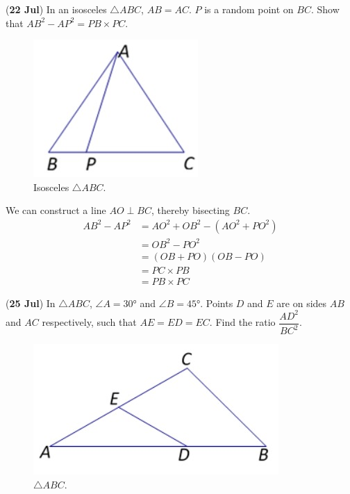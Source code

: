 \documentclass[12pt,answers]{exam}
\renewcommand{\frac}[2]{\dfrac{#1}{#2}}
\newcommand{\qndate}[2]{(\textbf{#1 #2})}
\begin{document}
\begin{questions}
	\question \qndate{22}{Jul} In an isosceles $\triangle ABC$, $AB=AC$. $P$ is a
	random point on $BC$. Show that ${AB}^2 - {AP}^2 = PB \times PC$.
	\begin{figure}[htpb]
		\centering
		\includegraphics[scale=.6]{images/0722_Tri.jpeg}
		\caption{Isosceles $\triangle ABC$.}
		\label{fig:0722_Tri}
	\end{figure}
	\begin{solution}
		We can construct a line $AO \perp BC$, thereby bisecting $BC$.
		\begin{align*}
			AB^2 - AP^2 & = AO^2 + OB^2 - \left(AO^2 + PO^2\right) \\
			            & = OB^2 - PO^2                            \\
			            & = (OB+PO)(OB-PO)                         \\
			            & = PC \times PB                           \\
			            & = PB \times PC
		\end{align*}
	\end{solution}

	\question \qndate{25}{Jul} In $\triangle ABC$, $\angle A = \ang{30}$ and $\angle B = \ang{45}$.
	Points $D$ and $E$ are on sides $AB$ and $AC$ respectively, such that $AE=ED=EC$.
	Find the ratio $\frac{AD^2}{BC^2}$.
	\begin{figure}[htpb]
		\centering
		\includegraphics[scale=.6]{images/0725_Tri.jpeg}
		\caption{$\triangle ABC$.}
		\label{fig:0725_Tri}
	\end{figure}


\end{questions}
\end{document}
